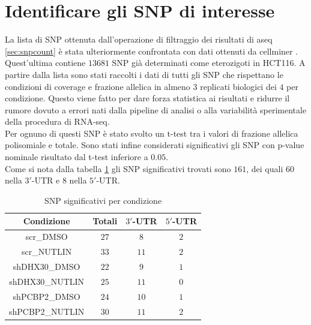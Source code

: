 \section{Identificare gli SNP di interesse}
\label{sec:snp_filter}
La lista di SNP ottenuta dall'operazione di filtraggio dei risultati di aseq \ref{sec:snpcount} \`e stata ulteriormente confrontata con dati ottenuti da cellminer \cite{cellminer}.
Quest'ultima contiene $13681$ SNP gi\`a determinati come eterozigoti in HCT116.
A partire dalla lista sono stati raccolti i dati di tutti gli SNP che rispettano le condizioni di coverage e frazione allelica in almeno $3$ replicati biologici dei $4$ per condizione.
Questo viene fatto per dare forza statistica ai risultati e ridurre il rumore dovuto a errori nati dalla pipeline di analisi o alla variabilit\`a sperimentale della procedura di RNA-seq.\\
Per ognuno di questi SNP \`e stato svolto un t-test \cite{ttest} tra i valori di frazione allelica polisomiale e totale.
Sono stati infine considerati significativi gli SNP con p-value nominale risultato dal t-test inferiore a $0.05$.\\
Come si nota dalla tabella \ref{tab:significativesnp} gli SNP significativi trovati sono $161$, dei quali $60$ nella $3'$-UTR e $8$ nella $5'$-UTR.
\begin{table}[H]
	\begin{tabular}{|c|c|c|c|}
		\hline
		Condizione & Totali & $3'$-UTR & $5'$-UTR\\
		\hline
		scr\_DMSO & $27$ & $8$ & $2$\\
		\hline
		scr\_NUTLIN & $33$ & $11$ & $2$\\
		\hline
		shDHX30\_DMSO & $22$ & $9$ & $1$\\
		\hline
		shDHX30\_NUTLIN & $25$ & $11$ & $0$\\
		\hline
		shPCBP2\_DMSO & $24$ & $10$ & $1$\\
		\hline
		shPCBP2\_NUTLIN & $30$ & $11$ & $2$\\
		\hline
	\end{tabular}
	\centering
	\caption{SNP significativi per condizione}
	\label{tab:significativesnp}
\end{table}

